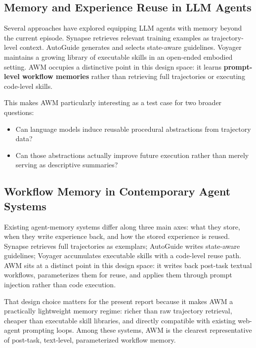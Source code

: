 \documentclass{article}
\providecommand{\tightlist}{%
  \setlength{\itemsep}{0pt}\setlength{\parskip}{0.8em}}
\begin{document}
\subsection{Memory and Experience Reuse in LLM
Agents}\label{memory-and-experience-reuse-in-llm-agents}

Several approaches have explored equipping LLM agents with memory beyond
the current episode. Synapse
\parencite{zheng2024synapsetrajectoryasexemplarpromptingmemory}
retrieves relevant training examples as trajectory-level context.
AutoGuide \parencite{fu2024autoguide} generates and selects state-aware
guidelines. Voyager \parencite{wang2023voyager} maintains a growing
library of executable skills in an open-ended embodied setting. AWM
occupies a distinctive point in this
design space: it learns \textbf{prompt-level workflow memories} rather
than retrieving full trajectories or executing code-level skills.

This makes AWM particularly interesting as a test case for two broader
questions:

\begin{itemize}
\tightlist
\item
  Can language models induce reusable procedural abstractions from
  trajectory data?
\item
  Can those abstractions actually improve future execution rather than
  merely serving as descriptive summaries?
\end{itemize}

\subsection{Workflow Memory in Contemporary Agent
Systems}\label{workflow-memory-in-contemporary-agent-systems}

Existing agent-memory systems differ along three main axes: what they
store, when they write experience back, and how the stored experience
is reused. Synapse
\parencite{zheng2024synapsetrajectoryasexemplarpromptingmemory}
retrieves full trajectories as exemplars; AutoGuide
\parencite{fu2024autoguide} writes state-aware guidelines; Voyager
\parencite{wang2023voyager} accumulates executable skills with a
code-level reuse path. AWM sits at a distinct point in this design
space: it writes back post-task textual workflows, parameterizes them
for reuse, and applies them through prompt injection rather than code
execution.

That design choice matters for the present report because it makes AWM a
practically lightweight memory regime: richer than raw trajectory
retrieval, cheaper than executable skill libraries, and directly
compatible with existing web-agent prompting loops. Among these systems,
AWM is the clearest representative of post-task, text-level,
parameterized workflow memory.
\end{document}
